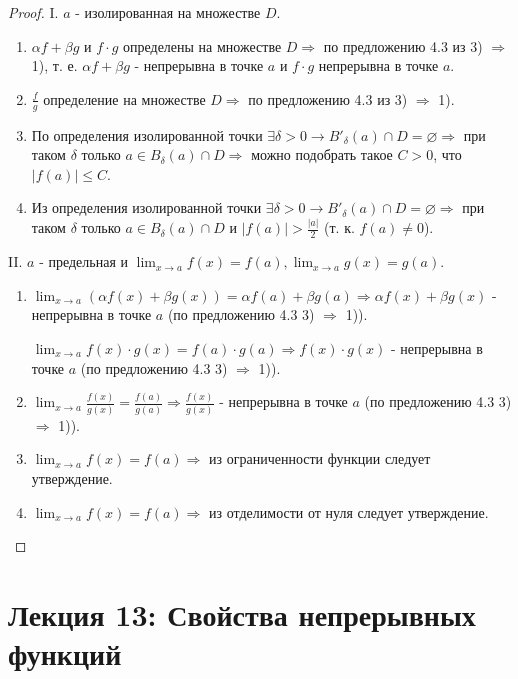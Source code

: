 	\begin{proof}
		I. $a$ - изолированная на множестве $D$.
		\begin{enumerate}
			\item $\alpha f + \beta g$ и $f \cdot g$ определены на множестве $D \Rightarrow$ по предложению 4.3 из 3) $\Rightarrow$ 1), т. е. $\alpha f + \beta g$ - непрерывна в точке $a$ и $f \cdot g$ непрерывна в точке $a$.
			\item $\frac{f}{g}$ определение на множестве $D \Rightarrow$ по предложению 4.3 из 3) $\Rightarrow$ 1).
			\item По определения изолированной точки $\exists \delta > 0 \rightarrow B'_{\delta}(a) \cap D = \varnothing \Rightarrow$ при таком $\delta$ только $a \in B_{\delta}(a) \cap D \Rightarrow$ можно подобрать такое $C > 0$, что $|f(a)| \leqslant C.$
			\item Из определения изолированной точки $\exists \delta > 0 \rightarrow B'_{\delta}(a) \cap D = \varnothing \Rightarrow$ при таком $\delta$ только $a \in B_{\delta}(a) \cap D$ и $|f(a)| > \frac{|a|}{2}$ (т. к. $f(a) \neq 0$).
		\end{enumerate}
		II. $a$ - предельная и $\lim_{x \to a} f(x) = f(a), \lim_{x \to a} g(x) = g(a).$
		\begin{enumerate}
			\item $\lim_{x \to a} (\alpha f(x) + \beta g(x)) = \alpha f(a) + \beta g(a) \Rightarrow \alpha f(x) + \beta g(x)$ - непрерывна в точке $a$ (по предложению 4.3 3) $\Rightarrow$ 1)).
			
			$\lim_{x \to a} f(x) \cdot g(x) = f(a) \cdot g(a) \Rightarrow f(x) \cdot g(x)$ - непрерывна в точке $a$ (по предложению 4.3 3) $\Rightarrow$ 1)).
			\item $\lim_{x \to a} \frac{f(x)}{g(x)} = \frac{f(a)}{g(a)} \Rightarrow \frac{f(x)}{g(x)}$ - непрерывна в точке $a$ (по предложению 4.3 3) $\Rightarrow$ 1)).
			\item $\lim_{x \to a} f(x) = f(a) \Rightarrow$ из ограниченности функции следует утверждение.
			\item $\lim_{x \to a} f(x) = f(a) \Rightarrow$ из отделимости от нуля следует утверждение.
		\end{enumerate}
	\end{proof}
	
	\newpage
	
	\section*{Лекция 13: Свойства непрерывных функций}
	
